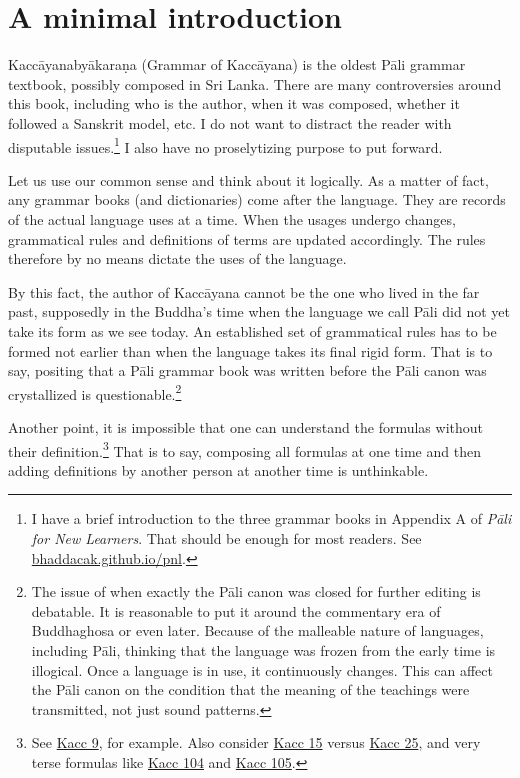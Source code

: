 \cleardoublepage
{}
{}
\chapter*{A minimal introduction}

Kaccāyanabyākaraṇa (Grammar of Kaccāyana) is the oldest Pāli grammar textbook, possibly composed in Sri Lanka. There are many controversies around this book, including who is the author, when it was composed, whether it followed a Sanskrit model, etc. I do not want to distract the reader with disputable issues.\footnote{I have a brief introduction to the three grammar books in Appendix A of \emph{Pāli for New Learners}. That should be enough for most readers. See \url{bhaddacak.github.io/pnl}.} I also have no proselytizing purpose to put forward.

Let us use our common sense and think about it logically. As a matter of fact, any grammar books (and dictionaries) come after the language. They are records of the actual language uses at a time. When the usages undergo changes, grammatical rules and definitions of terms are updated accordingly. The rules therefore by no means dictate the uses of the language.

By this fact, the author of Kaccāyana cannot be the one who lived in the far past, supposedly in the Buddha's time when the language we call Pāli did not yet take its form as we see today. An established set of grammatical rules has to be formed not earlier than when the language takes its final rigid form. That is to say, positing that a Pāli grammar book was written before the Pāli canon was crystallized is questionable.\footnote{The issue of when exactly the Pāli canon was closed for further editing is debatable. It is reasonable to put it around the commentary era of Buddhaghosa or even later. Because of the malleable nature of languages, including Pāli, thinking that the language was frozen from the early time is illogical. Once a language is in use, it continuously changes. This can affect the Pāli canon on the condition that the meaning of the teachings were transmitted, not just sound patterns.}

Another point, it is impossible that one can understand the formulas without their definition.\footnote{See \hyperref[sut:9]{Kacc 9}, for example. Also consider \hyperref[sut:15]{Kacc 15} versus \hyperref[sut:25]{Kacc 25}, and very terse formulas like \hyperref[sut:104]{Kacc 104} and \hyperref[sut:105]{Kacc 105}.} That is to say, composing all formulas at one time and then adding definitions by another person at another time is unthinkable.

